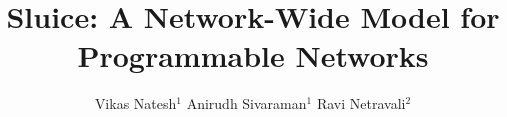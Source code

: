 \documentclass[sigconf]{acmart}
\begin{document}
\title{	Sluice: A Network-Wide Model for Programmable Networks}


\author{Vikas Natesh$^{ 1}$ \quad \quad Anirudh Sivaraman$^{ 1}$ \quad \quad Ravi Netravali$^{ 2}$}

\renewcommand{\shortauthors}{V. Natesh.et al.}


\maketitle





\end{document}

